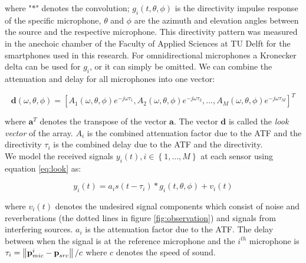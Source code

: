 
where "$\ast$" denotes the convolution; $g_i(t,\theta,\phi)$ is the directivity impulse response \cite{BAP:RosalieTim} of the specific microphone, $\theta$ and $\phi$ are the azimuth and elevation angles between the source and the respective microphone. This directivity pattern was measured in the anechoic chamber of the Faculty of Applied Sciences at TU Delft for the smartphones used in this research. For omnidirectional microphones a Kronecker delta can be used for $g_i$, or it can simply be omitted. We can combine the attenuation and delay for all microphones into one vector:

\begin{equation}
\textbf{d}(\omega,\theta,\phi) = [A_{1}(\omega,\theta,\phi)e^{-j\omega\tau_{1}},A_{2}(\omega,\theta,\phi)e^{-j\omega\tau_{2}},...,A_{M}(\omega,\theta,\phi)e^{-j\omega\tau_{M}}]^{T}
\end{equation}


where $\textbf{a}^{T}$ denotes the transpose of the vector $\textbf{a}$. The vector $\textbf{d}$ is called the \textit{look vector} of the array. $A_{i}$ is the combined attenuation factor due to the ATF and the directivity $\tau_{i}$ is the combined delay due to the ATF and the directivity.
\\
We model the received signals ${y}_{i}(t),i \in \left\{ {1,...,M}\right\}$ at each sensor using equation \ref{eq:look} as:

\begin{equation}
\label{eq:observationtime}
{y}_{i}(t) = a_{i}s(t-\tau_{i}) \ast g_i(t,\theta,\phi) + v_i(t)
\end{equation}

where $v_i(t)$ denotes the undesired signal components which consist of noise and reverberations (the dotted lines in figure \ref{fig:observation}) and signals from interfering sources. $a_i$ is the attenuation factor due to the ATF. The delay between when the signal is at the reference microphone and the $i^{th}$ microphone is $\tau_{i} = \left\lVert\textbf{p}_{mic}^{i}-\textbf{p}_{src}\right\rVert/c$ where $c$ denotes the speed of sound.

